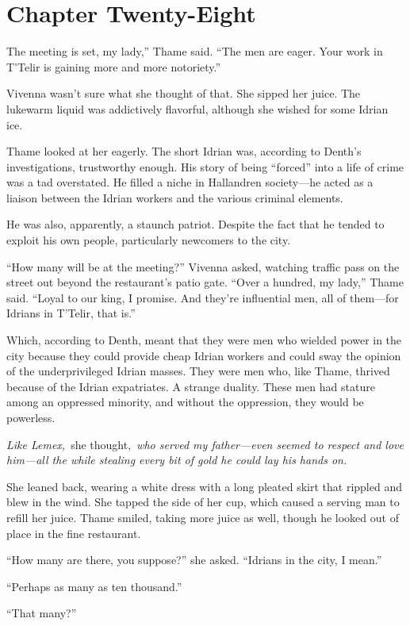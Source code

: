 \section{Chapter Twenty-Eight}

The meeting is set, my lady,” Thame said. “The men are eager. Your work in T’Telir is gaining more and more notoriety.”

Vivenna wasn’t sure what she thought of that. She sipped her juice. The lukewarm liquid was addictively flavorful, although she wished for some Idrian ice.

Thame looked at her eagerly. The short Idrian was, according to Denth’s investigations, trustworthy enough. His story of being “forced” into a life of crime was a tad overstated. He filled a niche in Hallandren society—he acted as a liaison between the Idrian workers and the various criminal elements.

He was also, apparently, a staunch patriot. Despite the fact that he tended to exploit his own people, particularly newcomers to the city.

“How many will be at the meeting?” Vivenna asked, watching traffic pass on the street out beyond the restaurant’s patio gate. “Over a hundred, my lady,” Thame said. “Loyal to our king, I promise. And they’re influential men, all of them—for Idrians in T’Telir, that is.”

Which, according to Denth, meant that they were men who wielded power in the city because they could provide cheap Idrian workers and could sway the opinion of the underprivileged Idrian masses. They were men who, like Thame, thrived because of the Idrian expatriates. A strange duality. These men had stature among an oppressed minority, and without the oppression, they would be powerless.

\textit{Like Lemex,}~she thought,~\textit{who served my father—even seemed to respect and love him—all the while stealing every bit of gold he could lay his hands on.}

She leaned back, wearing a white dress with a long pleated skirt that rippled and blew in the wind. She tapped the side of her cup, which caused a serving man to refill her juice. Thame smiled, taking more juice as well, though he looked out of place in the fine restaurant.

“How many are there, you suppose?” she asked. “Idrians in the city, I mean.”

“Perhaps as many as ten thousand.”

“That many?”

